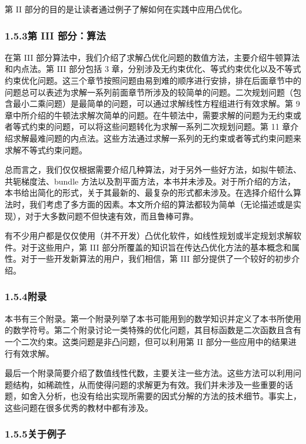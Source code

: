 \documentclass[UTF8,12pt,a4paper,fontset=fandol]{ctexart}
\begin{document}
第 II 部分的目的是让读者通过例子了解如何在实践中应用凸优化。

\subsubsection*{1.5.3\quad 第 III 部分：算法}

在第 III 部分算法中，我们介绍了求解凸优化问题的数值方法，主要介绍牛顿算法和内点法。第 III 部分包括 3 章，分别涉及无约束优化、等式约束优化以及不等式约束优化问题。这三个章节按照问题由易到难的顺序进行安排，排在后面章节中的问题总可以表述为求解一系列前面章节所涉及的较简单的问题。二次规划问题（包含最小二乘问题）是最简单的问题，可以通过求解线性方程组进行有效求解。第 9 章中所介绍的牛顿法求解次简单的问题。在牛顿法中，需要求解的问题为无约束或者等式约束的问题，可以将这些问题转化为求解一系列二次规划问题。第 11 章介绍求解最难问题的内点法。这些方法通过求解一系列的无约束或者等式约束问题来求解不等式约束问题。

总而言之，我们仅仅根据需要介绍几种算法，对于另外一些好方法，如拟牛顿法、共轭梯度法、bundle 方法以及割平面方法，本书并未涉及。对于所介绍的方法，本书给出简化的形式，关于其最新的、最复杂的形式都未涉及。在选择介绍什么算法时，我们考虑了多方面的因素。本文所介绍的算法都较为简单（无论描述或是实现），对于大多数问题不但快速有效，而且鲁棒可靠。

有不少用户都是仅仅使用（并不开发）凸优化软件，如线性规划或半定规划求解软件。对于这些用户，第 III 部分所覆盖的知识旨在传达凸优化方法的基本概念和属性。对于一些开发新算法的用户，我们相信，第 III 部分提供了一个较好的初步介绍。

\subsubsection*{1.5.4\quad 附录}

本书有三个附录。第一个附录列举了本书可能用到的数学知识并定义了本书所使用的数学符号。第二个附录讨论一类特殊的优化问题，其目标函数是二次函数且含有一个二次约束。这类问题是非凸问题，但可以利用第 II 部分一些应用中的结果进行有效求解。

最后一个附录简要介绍了数值线性代数，主要关注一些方法。这些方法可以利用问题结构，如稀疏性，从而使得问题的求解更为有效。我们并未涉及一些重要的话题，如舍入分析，也没有给出实现所需要的因式分解的方法的技术细节。事实上，这些问题在很多优秀的教材中都有涉及。

\subsubsection*{1.5.5\quad 关于例子}
\end{document}
